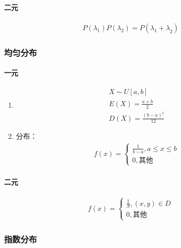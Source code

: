 \documentclass[12pt]{book}
\begin{document}
\paragraph{二元}

\begin{gather*}
P(\lambda_1)P(\lambda_2) 
= P({\lambda_1+\lambda}_2)
\end{gather*}




\subsubsection{均匀分布}


\paragraph{一元} 


\begin{enumerate}[1.]
    \item \begin{gather*}
              X\sim U[a,b] \\
              E(X)=\frac{a+b}{2} \\
              D(X)=\frac{(b-a)^2}{12}
          \end{gather*}
    \item 分布：
          \begin{gather*}
              f(x) = \begin{cases}
                  \frac{1}{b-a}, a\leqslant x\leqslant b \\
                  0, \text{其他}
              \end{cases}
          \end{gather*}
\end{enumerate}




\paragraph{二元}

\begin{gather*}
    f(x) = \begin{cases}
        \frac{1}{S}, (x,y)\in D \\
        0, \text{其他}
    \end{cases}
\end{gather*}


\subsubsection{指数分布}
\end{document}
